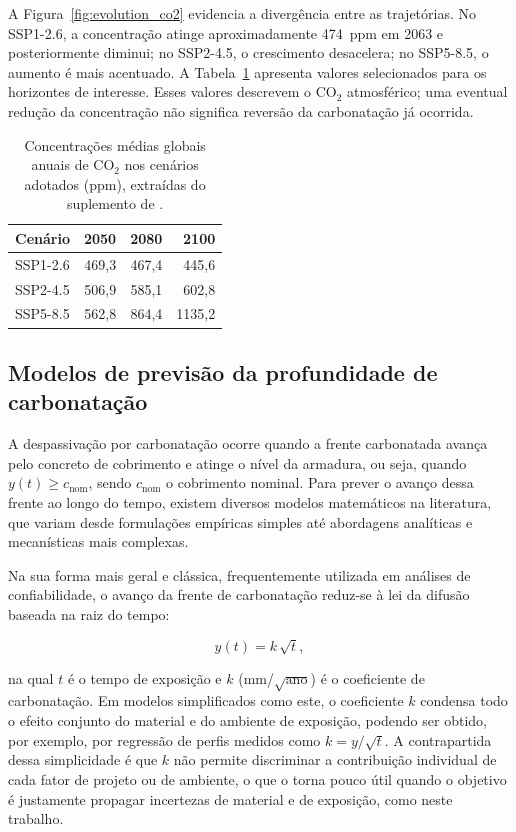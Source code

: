 A Figura~\ref{fig:evolution_co2} evidencia a divergência entre as trajetórias. No SSP1-2.6, a concentração atinge aproximadamente 474~ppm em 2063 e posteriormente diminui; no SSP2-4.5, o crescimento desacelera; no SSP5-8.5, o aumento é mais acentuado. A Tabela~\ref{tab:co2_scenarios} apresenta valores selecionados para os horizontes de interesse. Esses valores descrevem o CO$_2$ atmosférico; uma eventual redução da concentração não significa reversão da carbonatação já ocorrida.

\begin{table}[htbp]
    \centering
    \caption{Concentrações médias globais anuais de CO$_2$ nos cenários adotados (ppm), extraídas do suplemento de \textcite{meinshausen2020}.}
    \label{tab:co2_scenarios}
    \begin{tabular}{lrrr}
        \toprule
        Cenário & 2050 & 2080 & 2100 \\
        \midrule
        SSP1-2.6 & 469,3 & 467,4 & 445,6 \\
        SSP2-4.5 & 506,9 & 585,1 & 602,8 \\
        SSP5-8.5 & 562,8 & 864,4 & 1135,2 \\
        \bottomrule
    \end{tabular}
\end{table}

\subsection{Modelos de previs\~ao da profundidade de carbonata\c{c}\~ao}
\label{subsec:modelo_possan}

A despassivação por carbonatação ocorre quando a frente carbonatada avança pelo concreto de cobrimento e atinge o nível da armadura, ou seja, quando $y(t) \geq c_{\mathrm{nom}}$, sendo $c_{\mathrm{nom}}$ o cobrimento nominal. Para prever o avanço dessa frente ao longo do tempo, existem diversos modelos matemáticos na literatura, que variam desde formulações empíricas simples até abordagens analíticas e mecanísticas mais complexas.

Na sua forma mais geral e clássica, frequentemente utilizada em análises de confiabilidade, o avanço da frente de carbonatação reduz-se à lei da difusão baseada na raiz do tempo:

\begin{equation}\label{eq:raiz_t}
y(t) = k\,\sqrt{t},
\end{equation}

\noindent na qual $t$ é o tempo de exposição e $k$ (mm/$\sqrt{\text{ano}}$) é o coeficiente de carbonatação. Em modelos simplificados como este, o coeficiente $k$ condensa todo o efeito conjunto do material e do ambiente de exposição, podendo ser obtido, por exemplo, por regressão de perfis medidos como $k = y/\sqrt{t}$. A contrapartida dessa simplicidade é que $k$ não permite discriminar a contribuição individual de cada fator de projeto ou de ambiente, o que o torna pouco útil quando o objetivo é justamente propagar incertezas de material e de exposição, como neste trabalho.

